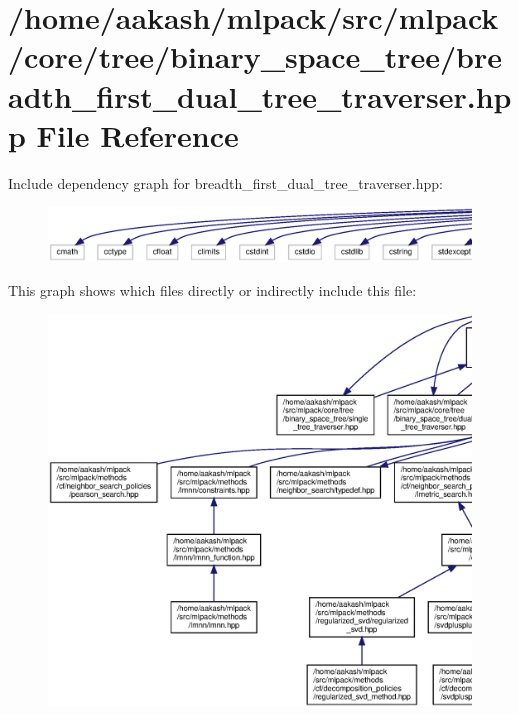 \section{/home/aakash/mlpack/src/mlpack/core/tree/binary\+\_\+space\+\_\+tree/breadth\+\_\+first\+\_\+dual\+\_\+tree\+\_\+traverser.hpp File Reference}
\label{breadth__first__dual__tree__traverser_8hpp}
Include dependency graph for breadth\+\_\+first\+\_\+dual\+\_\+tree\+\_\+traverser.\+hpp\+:
\nopagebreak
\begin{figure}[H]
\begin{center}
\leavevmode
\includegraphics[width=350pt]{breadth__first__dual__tree__traverser_8hpp__incl}
\end{center}
\end{figure}
This graph shows which files directly or indirectly include this file\+:
\nopagebreak
\begin{figure}[H]
\begin{center}
\leavevmode
\includegraphics[width=350pt]{breadth__first__dual__tree__traverser_8hpp__dep__incl}
\end{center}
\end{figure}
